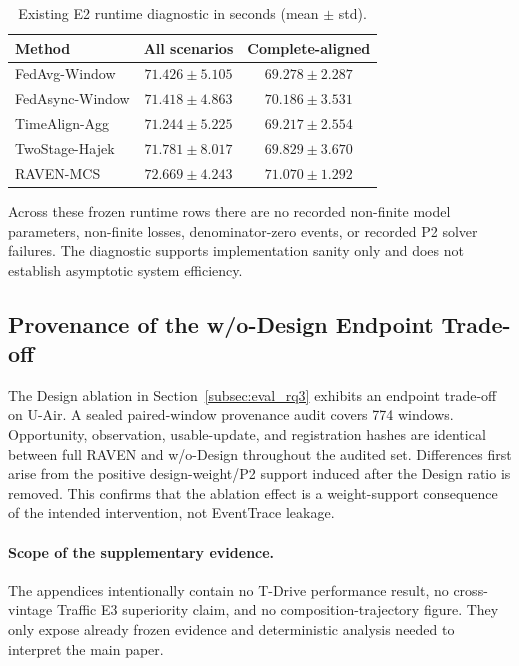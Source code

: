 \documentclass[letterpaper,journal]{IEEEtran}
\begin{document}
\begin{table}[t]
\centering
\caption{Existing E2 runtime diagnostic in seconds (mean $\pm$ std).}
\label{tab:app_runtime}
\footnotesize
\setlength{\tabcolsep}{4.5pt}
\begin{tabular}{lcc}
\toprule
Method & All scenarios & Complete-aligned\\
\midrule
FedAvg-Window & $71.426\pm5.105$ & $69.278\pm2.287$ \\
FedAsync-Window & $71.418\pm4.863$ & $70.186\pm3.531$ \\
TimeAlign-Agg & $71.244\pm5.225$ & $69.217\pm2.554$ \\
TwoStage-Hajek & $71.781\pm8.017$ & $69.829\pm3.670$ \\
RAVEN-MCS & $72.669\pm4.243$ & $71.070\pm1.292$ \\
\bottomrule
\end{tabular}
\end{table}

Across these frozen runtime rows there are no recorded non-finite model
parameters, non-finite losses, denominator-zero events, or recorded P2 solver
failures.  The diagnostic supports implementation sanity only and does not
establish asymptotic system efficiency.

\subsection{Provenance of the w/o-Design Endpoint Trade-off}
\label{app:design_provenance}

The Design ablation in Section~\ref{subsec:eval_rq3} exhibits an endpoint
trade-off on U-Air.  A sealed paired-window provenance audit covers
774 windows.  Opportunity, observation, usable-update, and
registration hashes are identical between full RAVEN and w/o-Design throughout
the audited set.  Differences first arise from the positive design-weight/P2
support induced after the Design ratio is removed.  This confirms that the
ablation effect is a weight-support consequence of the intended intervention,
not EventTrace leakage.

\paragraph{Scope of the supplementary evidence.}
The appendices intentionally contain no T-Drive performance result, no
cross-vintage Traffic E3 superiority claim, and no composition-trajectory
figure.  They only expose already frozen evidence and deterministic analysis
needed to interpret the main paper.
\end{document}
